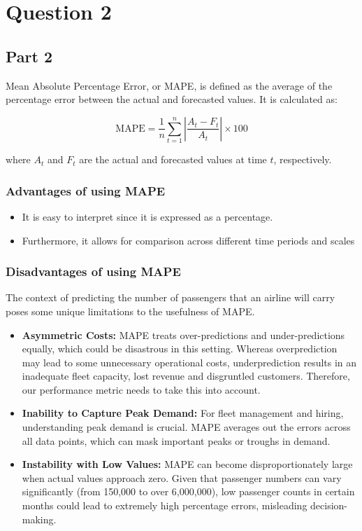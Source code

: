 \documentclass{article}
\author{}
\date{}
\begin{document}
\section{Question 2}

\subsection{Part 2}

Mean Absolute Percentage Error, or MAPE, is defined as the average of the percentage error between the actual and forecasted values. It is calculated as:

\[
\text{MAPE} = \frac{1}{n} \sum_{t=1}^{n} \left| \frac{A_t - F_t}{A_t} \right| \times 100
\]

where $A_t$ and $F_t$ are the actual and forecasted values at time $t$, respectively.

\subsubsection{Advantages of using MAPE}

\begin{itemize}
    \item It is easy to interpret since it is expressed as a    percentage.
    
    \item Furthermore, it allows for comparison across different time periods and scales
\end{itemize}

\subsubsection{Disadvantages of using MAPE}

The context of predicting the number of passengers that an
airline will carry poses some unique limitations to the usefulness of MAPE.

\begin{itemize}
    \item \textbf{Asymmetric Costs:} MAPE treats over-predictions and  under-predictions equally, which could be disastrous in this setting. Whereas overprediction may lead to some unnecessary operational costs, underprediction results in an inadequate fleet capacity, lost revenue and disgruntled customers. Therefore, our performance metric needs to take this into account.
    
    \item \textbf{Inability to Capture Peak Demand:} For fleet management and hiring, understanding peak demand is crucial. MAPE averages out the errors across all data points, which can mask important peaks or troughs in demand.
    
    \item \textbf{Instability with Low Values:} MAPE can become disproportionately large when actual values approach zero. Given that passenger numbers can vary significantly (from 150,000 to over 6,000,000), low passenger counts in certain months could lead to extremely high percentage errors, misleading decision-making.
\end{itemize}
\end{document}
